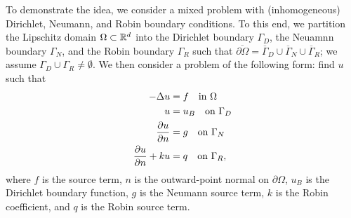 To demonstrate the idea, we consider a mixed problem with (inhomogeneous) Dirichlet, Neumann, and Robin boundary conditions.
To this end, we partition the Lipschitz domain $\Omega \subset \mathbb{R}^d$ into the Dirichlet boundary $\Gamma_D$, the Neuamnn boundary $\Gamma_N$, and the Robin boundary $\Gamma_R$ such that $\overline{\partial \Omega} = \overline{\Gamma}_D \cup \overline{\Gamma}_N \cup \overline{\Gamma}_R$; we assume $\Gamma_D \cup \Gamma_R \neq \emptyset$. We then consider a problem of the following form: find $u$ such that
\begin{align*}
  - \Delta u &= f \quad \text{in } \Omega
  \\
  u &= u_B \quad \text{on } \Gamma_D \\
  \frac{\partial u}{\partial n} &= g \quad \text{on } \Gamma_N \\
  \frac{\partial u}{\partial n}+ k u &= q \quad \text{on } \Gamma_R,
\end{align*}
where $f$ is the source term,  $n$ is the outward-point normal on $\partial \Omega$, $u_B$ is the Dirichlet boundary function, $g$ is the Neumann source term, $k$ is the Robin coefficient, and $q$ is the Robin source term.

